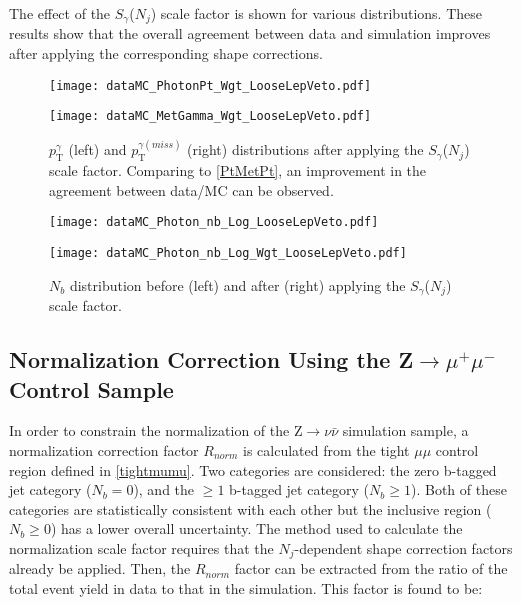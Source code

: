 \vspace{1em}

The effect of the $S_{\gamma}$($N_j$) scale factor is shown for various distributions. These results show that the overall agreement between data and simulation improves after applying the corresponding shape corrections.

\begin{figure}[H]
\begin{center}
\begin{minipage}[b]{0.45\textwidth}
    \texttt{[image: dataMC\_PhotonPt\_Wgt\_LooseLepVeto.pdf]}
\end{minipage}
\begin{minipage}[b]{0.45\textwidth}
    \texttt{[image: dataMC\_MetGamma\_Wgt\_LooseLepVeto.pdf]}
\end{minipage}
\end{center}
\vspace{-1em}
\caption{$p_\text{T}^\gamma$ (left) and $p_\text{T}^{\gamma (miss)}$ (right) distributions after applying the $S_\gamma$($N_j$) scale factor. Comparing to \autoref{PtMetPt}, an improvement in the agreement between data/MC can be observed.}
\label{PtMetPtCorr}
\end{figure}

\begin{figure}[H]
\begin{center}
\begin{minipage}[b]{0.45\textwidth}
    \texttt{[image: dataMC\_Photon\_nb\_Log\_LooseLepVeto.pdf]}
\end{minipage}
\begin{minipage}[b]{0.45\textwidth}
    \texttt{[image: dataMC\_Photon\_nb\_Log\_Wgt\_LooseLepVeto.pdf]}
\end{minipage}
\end{center}
\vspace{-1em}
\caption{$N_b$ distribution before (left) and after (right) applying the $S_\gamma$($N_j$) scale factor. }
\end{figure}

\subsection{Normalization Correction Using the Z$\rightarrow\mu^{+}\mu^{-}$ Control Sample}

In order to constrain the normalization of the Z$\rightarrow\nu\bar{\nu}$ simulation sample, a normalization correction factor $R_{norm}$ is calculated from the tight $\mu\mu$ control region defined in \autoref{tightmumu}. Two categories are considered: the zero b-tagged jet category ($N_b = 0$), and the $\geq 1$ b-tagged jet category ($N_b \geq 1$). Both of these categories are statistically consistent with each other but the inclusive region ($N_b \geq 0$) has a lower overall uncertainty. The method used to calculate the normalization scale factor requires that the $N_j$-dependent shape correction factors already be applied. Then, the $R_{norm}$ factor can be extracted from the ratio of the total event yield in data to that in the simulation. This factor is found to be:


